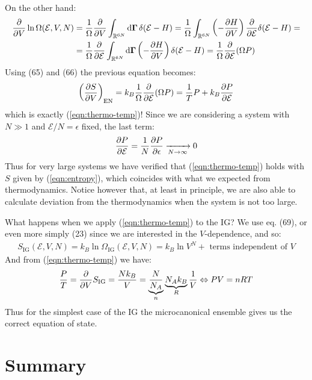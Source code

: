 \documentclass[../../main.tex]{subfiles}
\begin{document}
On the other hand:
\begin{align*}
    \pdv{V} \ln \Omega(\mathcal{E}, V, N) &= \frac{1}{\Omega} \pdv{V} \int_{\mathbb{R}^{6N}} \dd{\bm{\Gamma}} \delta(\mathcal{E}- H) = \frac{1}{\Omega} \int_{\mathbb{R}^{6N}} \left(-\pdv{H}{V}\right) \pdv{\mathcal{E}} \delta(\mathcal{E}-H) =\\
    &= \frac{1}{\Omega} \pdv{\mathcal{E}} \int_{\mathbb{R}^{6N}} \dd{\bm{\Gamma}} \left(-\pdv{H}{V}\right) \delta(\mathcal{E}-H) = \frac{1}{\Omega} \pdv{\mathcal{E}}(\Omega P) 
\end{align*}
Using (65) and (66) the previous equation becomes:
\begin{align*}
    \left(\pdv{S}{V}\right)_{\mathrm{EN}} = k_B \frac{1}{\Omega} \pdv{\mathcal{E}}(\Omega P) = \frac{1}{T} P + k_B \pdv{P}{\mathcal{E}}  
\end{align*}
which is exactly (\ref{eqn:thermo-temp})! Since we are considering a system with $N \gg 1$ and $\mathcal{E}/N = \epsilon$ fixed, the last term:
\begin{align*}
    \pdv{P}{\mathcal{E}} = \frac{1}{N} \pdv{P}{\epsilon}  \xrightarrow[N \to \infty]{}  0
\end{align*}
Thus for very large systems we have verified that (\ref{eqn:thermo-temp}) holds with $S$ given by (\ref{eqn:entropy}), which coincides with what we expected from thermodynamics. Notice however that, at least in principle, we are also able to calculate deviation from the thermodynamics when the system is not too large.

\medskip

What happens when we apply (\ref{eqn:thermo-temp}) to the IG? We use eq. (69), or even more simply (23) since we are interested in the $V$-dependence, and so:
\begin{align*}
    S_{\mathrm{IG}}(\mathcal{E}, V, N) = k_B \ln \Omega_{\mathrm{IG}} (\mathcal{E}, V, N) = k_B \ln V^N + \text{ terms independent of $V$}
\end{align*}
And from (\ref{eqn:thermo-temp}) we have:
\begin{align*}
    \frac{P}{T} = \pdv{V} S_{\mathrm{IG}} = \frac{N k_B}{V} = \underbrace{\frac{N}{N_A}}_{n} \underbrace{ N_A k_B}_{R}  \frac{1}{V} \Leftrightarrow PV = nRT
\end{align*}
Thus for the simplest case of the IG the microcanonical ensemble gives us the correct equation of state.

\section{Summary}
\end{document}
